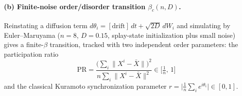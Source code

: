 \documentclass[11pt]{article}
\begin{document}
\paragraph{(b) Finite-noise order/disorder transition $\beta_c(n,D)$.} Reinstating a diffusion term $d\theta_i=[\text{drift}]\,dt+\sqrt{2D}\,dW_i$ and simulating by Euler--Maruyama ($n=8$, $D=0.15$, splay-state initialization plus small noise) gives a finite-$\beta$ transition, tracked with two independent order parameters: the participation ratio
\begin{equation}
    \mathrm{PR} = \frac{\big(\sum_i\|X^i-\bar X\|\big)^2}{n\sum_i\|X^i-\bar X\|^2} \in \Big[\tfrac1n,\,1\Big]
    \label{eq:pr-def}
\end{equation}
and the classical Kuramoto synchronization parameter $r=\big|\tfrac1n\sum_i e^{i\theta_i}\big|\in[0,1]$.
\end{document}
